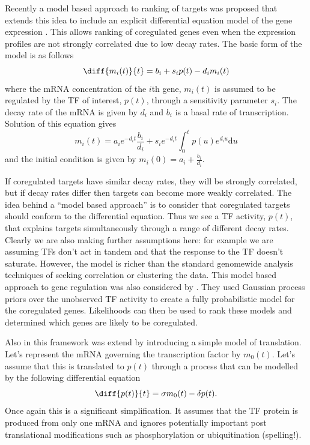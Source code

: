 \documentclass{article}
\begin{document}
Recently a  model based  approach to ranking  of targets  was proposed
that extends  this idea to  include an explicit  differential equation
model of  the gene expression \cite{Barenco:ranked06}. This  allows ranking of
coregulated genes  even when the expression profiles  are not strongly
correlated due to  low decay rates. The basic form of  the model is as
follows
\begin{equation}
  \diff{m_i(t)}{t} = b_i + s_i p(t) - d_i m_i(t)
\end{equation}
where the mRNA concentration of the $i$th gene, $m_i(t)$ is assumed to
be  regulated by  the TF  of interest,  $p(t)$, through  a sensitivity
parameter $s_i$.  The decay  rate of  the mRNA is  given by  $d_i$ and
$b_i$  is a  basal rate  of transcription.  Solution of  this equation
gives
\begin{equation}
  m_i(t) = a_i e^{-d_it} \frac{b_i}{d_i} + s_i
  e^{-d_it}\int_0^tp(u)e^{d_i u}\mathrm{d} u \label{eq:linearOperator}
\end{equation}
and the initial condition is given by $m_i(0)=a_i + \frac{b_i}{d_i}$. 

If coregulated targets have similar decay rates, they will be strongly
correlated, but  if decay  rates differ then  targets can  become more
weakly correlated.  The  idea behind a ``model based  approach'' is to
consider that  coregulated targets should conform  to the differential
equation. Thus  we see  a TF activity,  $p(t)$, that  explains targets
simultaneously through  a range of different decay  rates.  Clearly we
are also making further assumptions  here: for example we are assuming
TFs  don't act  in tandem  and  that the  response to  the TF  doesn't
saturate. However,  the model is  richer than the  standard genomewide
analysis   techniques  of  seeking   correlation  or   clustering  the
data. This model based approach to gene regulation was also considered
by  \cite{Gao:latent08}. They  used Gaussian  process priors  over the
unobserved TF activity  to create a fully probabilistic  model for the
coregulated genes.  Likelihoods can then  be used to rank these models
and determined which genes are likely to be coregulated.

Also in \cite{Gao:latent08} this framework was extend by introducing a
simple model  of translation.  Let's represent the  mRNA governing the
transcription factor by $m_0(t)$. Let's assume that this is translated
to  $p(t)$ through a  process that  can be  modelled by  the following
differential equation
\begin{equation}
  \diff{p(t)}{t} = \sigma m_0(t) - \delta p(t).
\end{equation}
Once again this  is a significant simplification. It  assumes that the
TF  protein is  produced from  only one  mRNA and  ignores potentially
important post translational  modifications such as phosphorylation or
ubiquitination (spelling!).
\end{document}
